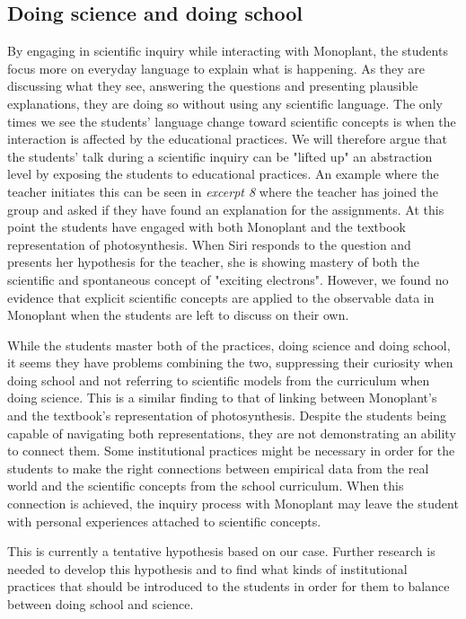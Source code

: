 \subsection{Doing science and doing school}
By engaging in scientific inquiry while interacting with Monoplant, the students focus more on everyday language to explain what is happening. As they are discussing what they see, answering the questions and presenting plausible explanations, they are doing so without using any scientific language. The only times we see the students' language change toward scientific concepts is when the interaction is affected by the educational practices. We will therefore argue that the students' talk during a scientific inquiry can be "lifted up" an abstraction level by exposing the students to educational practices. An example where the teacher initiates this can be seen in \emph{excerpt 8} where the teacher has joined the group and asked if they have found an explanation for the assignments. At this point the students have engaged with both Monoplant and the textbook representation of photosynthesis. When Siri responds to the question and presents her hypothesis for the teacher, she is showing mastery of both the scientific and spontaneous concept of "exciting electrons". However, we found no evidence that explicit scientific concepts are applied to the observable data in Monoplant when the students are left to discuss on their own. 

While the students master both of the practices, doing science and doing school, it seems they have problems combining the two, suppressing their curiosity when doing school and not referring to scientific models from the curriculum when doing science. This is a similar finding to that of linking between Monoplant's and the textbook's representation of photosynthesis. Despite the students being capable of navigating both representations, they are not demonstrating an ability to connect them. Some institutional practices might be necessary in order for the students to make the right connections between empirical data from the real world and the scientific concepts from the school curriculum. When this connection is achieved, the inquiry process with Monoplant may leave the student with personal experiences attached to scientific concepts. 

This is currently a tentative hypothesis based on our case. Further research is needed to develop this hypothesis and to find what kinds of institutional practices that should be introduced to the students in order for them to balance between doing school and science.




